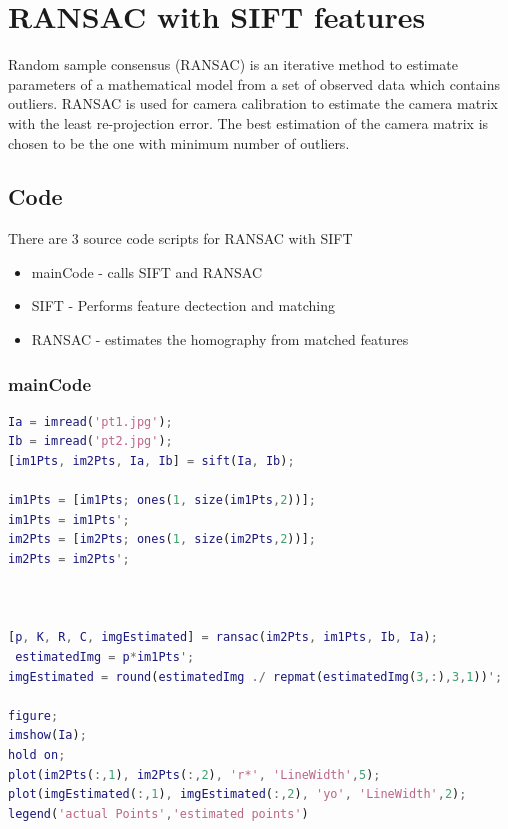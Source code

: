 \documentclass[12pt]{article}
\begin{document}
\section{RANSAC with SIFT features}
Random sample consensus (RANSAC) is an iterative method to estimate parameters of a mathematical model from a set of observed data which contains outliers. RANSAC is used for camera calibration to estimate the camera matrix with the least re-projection error.
The best estimation of the camera matrix is chosen to be the one with minimum number of outliers.



\subsection{Code} 
There are 3 source code scripts for RANSAC with SIFT
\begin{itemize}
\item mainCode - calls SIFT and RANSAC
\item SIFT - Performs feature dectection and matching
\item RANSAC - estimates the homography from matched features
\end{itemize}


\subsubsection{mainCode}
\begin{lstlisting}[language=matlab]
Ia = imread('pt1.jpg');
Ib = imread('pt2.jpg');
[im1Pts, im2Pts, Ia, Ib] = sift(Ia, Ib);

im1Pts = [im1Pts; ones(1, size(im1Pts,2))];
im1Pts = im1Pts';
im2Pts = [im2Pts; ones(1, size(im2Pts,2))];
im2Pts = im2Pts';

 

[p, K, R, C, imgEstimated] = ransac(im2Pts, im1Pts, Ib, Ia);
 estimatedImg = p*im1Pts';
imgEstimated = round(estimatedImg ./ repmat(estimatedImg(3,:),3,1))';

figure;
imshow(Ia);
hold on;
plot(im2Pts(:,1), im2Pts(:,2), 'r*', 'LineWidth',5);
plot(imgEstimated(:,1), imgEstimated(:,2), 'yo', 'LineWidth',2);  
legend('actual Points','estimated points')  
\end{lstlisting}

\vspace{2em}
\end{document}
